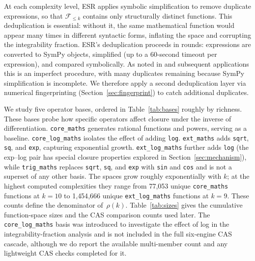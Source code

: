 \documentclass[preprint,12pt,authoryear]{elsarticle}
\newcommand{\Fleq}{\mathcal{F}_{\leq k}}
\newcommand{\rhok}{\rho(k)}
\newcommand{\hd}[1]{{\color{red}\textbf{[HD: #1]}}}
\begin{document}
At each complexity level, ESR applies symbolic simplification to remove duplicate expressions, so that $\Fleq$ contains only structurally distinct functions. This deduplication is essential: without it, the same mathematical function would appear many times in different syntactic forms, inflating the space and corrupting the integrability fraction.
ESR's deduplication proceeds in rounds: expressions are converted to SymPy objects, simplified (up to a 60-second timeout per expression), and compared symbolically.
As noted in \cite{Bartlett2024} and subsequent applications this is an imperfect procedure, with many duplicates remaining because SymPy simplification is incomplete. We therefore apply a second deduplication layer via numerical fingerprinting (Section~\ref{sec:fingerprint}) to catch additional duplicates.

We study five operator bases, ordered in Table~\ref{tab:bases} roughly by richness.
These bases probe how specific operators affect closure under the inverse of differentiation. \texttt{core\_maths} generates rational functions and powers, serving as a baseline. \texttt{core\_log\_maths} isolates the effect of adding \texttt{log}. \texttt{ext\_maths} adds \texttt{sqrt}, \texttt{sq}, and \texttt{exp}, capturing exponential growth. \texttt{ext\_log\_maths} further adds \texttt{log} (the exp--log pair has special closure properties explored in Section~\ref{sec:mechanism}), while \texttt{trig\_maths} replaces \texttt{sqrt}, \texttt{sq}, and \texttt{exp} with \texttt{sin} and \texttt{cos} and is not a superset of any other basis.
The spaces grow roughly exponentially with $k$; at the highest computed complexities they range from 77{,}053 unique \texttt{core\_maths} functions at $k=10$ to 1{,}454{,}666 unique \texttt{ext\_log\_maths} functions at $k=9$.
These counts define the denominator of~$\rhok$.  Table~\ref{tab:sizes} gives the cumulative function-space sizes and the CAS comparison counts used later. The \texttt{core\_log\_maths} basis was introduced to investigate the effect of log in the integrability-fraction analysis and is not included in the full six-engine CAS cascade, although we do report the available multi-member count and any lightweight CAS checks completed for it.
\end{document}
